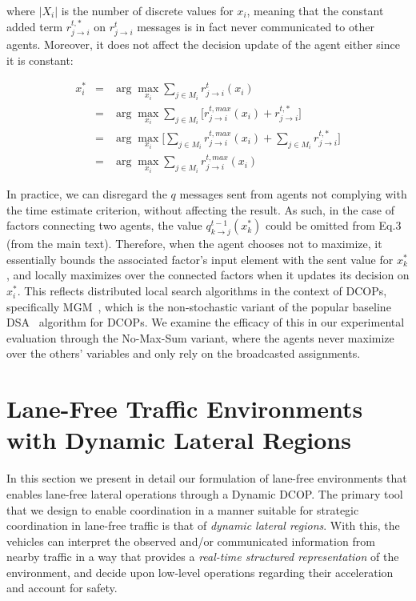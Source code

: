 \noindent where $|X_i|$ is the number of discrete values for $x_i$, meaning that the constant added term $r^{t,*}_{j \rightarrow i}$ on $r^t_{j\rightarrow i}$ messages is in fact never communicated to other agents.
Moreover, it does not affect the decision update of the agent either since it is constant: 

\begin{eqnarray}
    x_i^* &=& \arg \max_{x_i} \sum_{j \in M_i} r^t_{j \rightarrow i} (x_i) \nonumber \\
    &=& \arg \max_{x_i} \sum_{j \in M_i} \lbrack r^{t,max}_{j \rightarrow i} (x_i) + r^{t,*}_{j \rightarrow i} \rbrack \nonumber \\
    &=& \arg \max_{x_i} \big \lbrack \sum_{j \in M_i} r^{t,max}_{j \rightarrow i} (x_i) + \sum_{j \in M_i} r^{t,*}_{j \rightarrow i} \big \rbrack \nonumber \\
    &=& \arg \max_{x_i} \sum_{j \in M_i} r^{t,max}_{j \rightarrow i} (x_i)
\end{eqnarray}

In practice, we can disregard the $q$ messages sent from agents not complying with the time estimate criterion, without affecting the result.
As such, in the case of factors connecting two agents, the value $q^{t-1}_{k\rightarrow j}(x_k^*)$ could be omitted from Eq.3 (from the main text).
Therefore, when the agent chooses not to maximize, it essentially bounds the associated factor's input element with the sent value for $x_k^*$, and locally maximizes over the connected factors when it updates its decision on $x_i^*$.
This reflects distributed local search algorithms in the context of DCOPs, specifically MGM~\cite{mgm_paper}, which is the non-stochastic variant of the popular baseline DSA~\cite{dsa_paper} algorithm for DCOPs.
We examine the efficacy of this in our experimental evaluation through the No-Max-Sum variant, where the agents never maximize over the others' variables and only rely on the broadcasted assignments. 





\section{Lane-Free Traffic Environments with Dynamic Lateral Regions}\label{lf:d_lr}


In this section we present in detail our formulation of lane-free environments that enables lane-free lateral operations through a Dynamic DCOP.
The primary tool that we design to enable coordination in a manner suitable for strategic coordination in lane-free traffic is that of {\em dynamic lateral regions}.
With this, the vehicles can interpret the observed and/or communicated information from nearby traffic in a way that provides a {\em real-time structured representation} of the environment, and decide upon low-level operations regarding their acceleration and account for safety.

